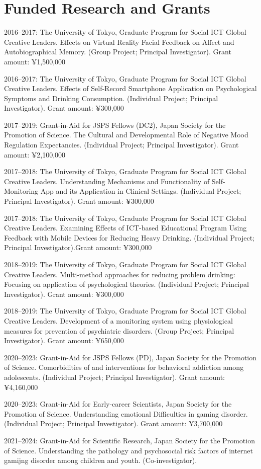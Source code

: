 \documentclass{article}
\begin{document}
\section{Funded Research and Grants}
\begin{description}
	\item 2016--2017: The University of Tokyo, Graduate Program for Social ICT Global Creative Leaders. Effects on Virtual Reality Facial Feedback on Affect and Autobiographical Memory. (Group Project; Principal Investigator). Grant amount: ¥1,500,000
	\item 2016--2017: The University of Tokyo, Graduate Program for Social ICT Global Creative Leaders. Effects of Self-Record Smartphone Application on Psychological Symptoms and Drinking Consumption. (Individual Project; Principal Investigator). Grant amount: ¥300,000
	\item 2017--2019: Grant-in-Aid for JSPS Fellows (DC2), Japan Society for the Promotion of Science. The Cultural and Developmental Role of Negative Mood Regulation Expectancies. (Individual Project; Principal Investigator). Grant amount: ¥2,100,000
	\item 2017--2018: The University of Tokyo, Graduate Program for Social ICT Global Creative Leaders. Understanding Mechanisms and Functionality of Self-Monitoring App and its Application in Clinical Settings. (Individual Project; Principal Investigator). Grant amount: ¥300,000
	\item 2017--2018: The University of Tokyo, Graduate Program for Social ICT Global Creative Leaders. Examining Effects of ICT-based Educational Program Using Feedback with Mobile Devices for Reducing Heavy Drinking. (Individual Project; Principal Investigator).Grant amount: ¥300,000
	\item 2018--2019: The University of Tokyo, Graduate Program for Social ICT Global Creative Leaders. Multi-method approaches for reducing problem drinking: Focusing on application of psychological theories. (Individual Project; Principal Investigator). Grant amount: ¥300,000
	\item 2018--2019: The University of Tokyo, Graduate Program for Social ICT Global Creative Leaders. Development of a monitoring system using physiological measures for prevention of psychiatric disorders. (Group Project; Principal Investigator). Grant amount: ¥650,000
	\item 2020--2023: Grant-in-Aid for JSPS Fellows (PD), Japan Society for the Promotion of Science. Comorbidities of and interventions for behavioral addiction among adolescents. (Individual Project; Principal Investigator). Grant amount: ¥4,160,000
	\item 2020--2023: Grant-in-Aid for Early-career Scientists, Japan Society for the Promotion of Science. Understanding emotional Difficulties in gaming disorder. (Individual Project; Principal Investigator). Grant amount: ¥3,700,000
	\item 2021--2024: Grant-in-Aid for Scientific Research, Japan Society for the Promotion of Science. Understanding the pathology and psychosocial risk factors of internet gamijng disorder among children and youth. (Co-investigator).
	\end{description}
\end{document}
